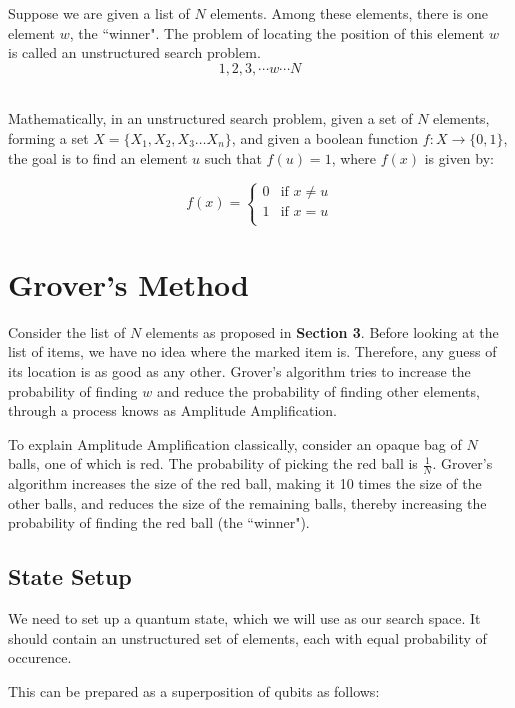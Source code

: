 \documentclass[a4paper]{article}
\begin{document}
Suppose we are given a list of $N$ elements. Among these elements, there is one
element $w$, the ``winner". The problem of locating the position of this element
$w$ is called an unstructured search problem.  $$ 1, 2, 3, \cdots w \cdots N $$
\\ \par

Mathematically, in an unstructured search problem, given a set of $N$ elements,
forming a set $X = \{X_1, X_2, X_3 \ldots X_n\} $, and given a boolean function
$f: X \to \{0, 1\}$, the goal is to find an element $u$ such that $f(u) = 1$,
where $f(x)$ is given by:

\[
    f(x) = \left\{
        \begin{array}{ll}
            0 & \mbox{if } x \neq u \\
            1 & \mbox{if } x = u \\
        \end{array}
        \right.
\]

\pagebreak


\section{ Grover's Method }
Consider the list of $N$ elements as proposed in \textbf{Section 3}. Before
looking at the list of items, we have no idea where the marked item is.
Therefore, any guess of its location is as good as any other. Grover's algorithm
tries to increase the probability of finding $w$ and reduce the probability of 
finding other elements, through a process knows as Amplitude Amplification.
\\
\par

To explain Amplitude Amplification classically, consider an opaque bag of $N$
balls, one of which is red. The probability of picking the red ball is
$\frac{1}{N}$.  Grover's algorithm increases the size of the red ball, making
it 10 times the size of the other balls, and reduces the size of the remaining
balls, thereby increasing the probability of finding the red ball (the ``winner").
\\
\par

\subsection{ State Setup }
We need to set up a quantum state, which we will use as our search space. It should 
contain an unstructured set of elements, each with equal probability of occurence. 
\\
\par
This can be prepared as a superposition of qubits as follows:
\end{document}
